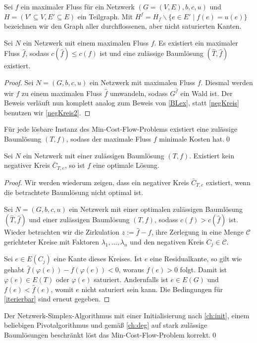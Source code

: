 \begin{nota}Sei $f$ ein maximaler Fluss für ein Netzwerk $(G=(V,E),b,c,u)$ und $H=(V'\subseteq V, E'\subseteq E)$ ein Teilgraph. Mit $H^f=H_f\backslash\{e\in E'\mid f(e)=u(e)\}$ bezeichnen wir den Graph aller durchflossenen, aber nicht saturierten Kanten.\end{nota}

\begin{thm}\label{BLex2}Sei $N$ ein Netzwerk mit einem maximalen Fluss $f$. Es existiert ein maximaler Fluss $\hat{f}$, sodass $c(\hat{f})\leq c(f)$ ist und eine zulässige Baumlösung $(\hat{T},\hat{f})$ existiert.\end{thm}
\begin{proof}Sei $N=(G,b,c,u)$ ein Netzwerk mit maximalen Fluss $f$. Diesmal werden wir $f$ zu einem maximalen Fluss $\hat{f}$ umwandeln, sodass $G^{\hat{f}}$ ein Wald ist. Der Beweis verläuft nun komplett analog zum Beweis von \cref{BLex}, statt \cref{negKreis} benutzen wir \cref{negKreis2}.\end{proof}

\begin{kor}Für jede lösbare Instanz des Min-Cost-Flow-Problems existiert eine zulässige Baumlösung $(T,f)$, sodass der maximale Fluss $f$ minimale Kosten hat.\qed\end{kor}

\begin{thm}\label{opt2}Sei $N$ ein Netzwerk mit einer zulässigen Baumlösung $(T,f)$. Existiert kein negativer Kreis $\bar{C}_{T,e}$, so ist $f$ eine optimale Lösung.\end{thm}
\begin{proof}Wir werden wiederum zeigen, dass ein negativer Kreis $\bar{C}_{T,e}$ existiert, wenn die betrachtete Baumlösung nicht optimal ist.

Sei $N=(G,b,c,u)$ ein Netzwerk mit einer optimalen zulässigen Baumlösung $(\hat{T},\hat{f})$ und einer zulässigen Baumlösung $(T,f)$, sodass $c(f)>c(\hat{f})$ ist. Wieder betrachten wir die Zirkulation $z:=\hat{f}-f$, ihre Zerlegung in eine Menge $\mathscr{C}$ gerichteter Kreise mit Faktoren $\lambda_1,\ldots,\lambda_n$ und den negativen Kreis $C_j\in\mathscr{C}$.

Sei $e\in E(C_j)$ eine Kante dieses Kreises. Ist $e$ eine Residualkante, so gilt wie gehabt $\hat{f}(\varphi(e))-f(\varphi(e))<0$, woraus $f(e)>0$ folgt. Damit ist $\varphi(e)\in E(T)$ oder $\varphi(e)$ saturiert. Andernfalls ist $e\in E(G)$ und $f(e)<\hat{f}(e)$, womit $e$ nicht saturiert sein kann. Die Bedingungen für \cref{iterierbar} sind erneut gegeben.\end{proof}

\begin{kor}Der Netzwerk-Simplex-Algorithmus mit einer Initialisierung nach \cref{ch:init}, einem beliebigen Pivotalgorithmus und gemäß \cref{ch:deg} auf stark zulässige Baumlösungen beschränkt löst das Min-Cost-Flow-Problem korrekt.\qed\end{kor}